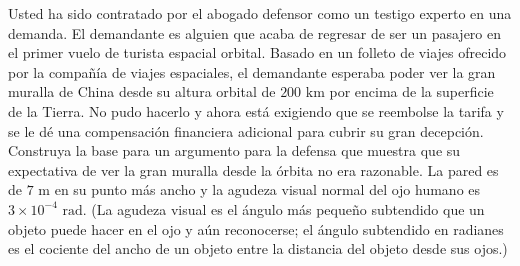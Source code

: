 \item Usted ha sido contratado por el abogado defensor como un testigo experto en una demanda. El demandante es alguien que acaba de regresar de ser un pasajero en el primer vuelo de turista espacial orbital. Basado en un folleto de viajes ofrecido por la compañía de viajes espaciales, el demandante esperaba poder ver la gran muralla de China desde su altura orbital de $200 \text{ km}$ por encima de la superficie de la Tierra. No pudo hacerlo y ahora está exigiendo que se reembolse la tarifa y se le dé una compensación financiera adicional para cubrir su gran decepción. Construya la base para un argumento para la defensa que muestra que su expectativa de ver la gran muralla desde la órbita no era razonable. La pared es de $7 \text{ m}$ en su punto más ancho y la agudeza visual normal del ojo humano es $3 \times 10^{-4} \text{ rad}$. (La agudeza visual es el ángulo más pequeño subtendido que un objeto puede hacer en el ojo y aún reconocerse; el ángulo subtendido en radianes es el cociente del ancho de un objeto entre la distancia del objeto desde sus ojos.)
